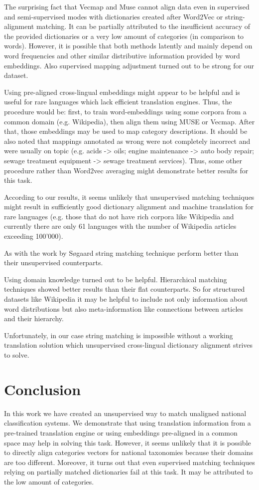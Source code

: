\documentclass[conference]{IEEEtran}
\begin{document}
The surprising fact that Vecmap and Muse cannot align data even in supervised and semi-supervised modes with dictionaries created after Word2Vec or string-alignment matching. It can be partially attributed to the insufficient accuracy of the provided dictionaries or a very low amount of categories (in comparison to words). However, it is possible that both methods latently and mainly depend on word frequencies and other similar distributive information provided by word embeddings. Also supervised mapping adjustment turned out to be strong for our dataset.

Using pre-aligned cross-lingual embeddings might appear to be helpful and is useful for rare languages which lack efficient translation engines. Thus, the procedure would be: first, to train word-embeddings using some corpora from a common domain (e.g. Wikipedia), then align them using MUSE or Vecmap. After that, those embeddings may be used to map category descriptions. It should be also noted that mappings annotated as wrong were not completely incorrect and were usually on topic (e.g. acids -> oils; engine maintenance -> auto body repair; sewage treatment equipment -> sewage treatment services). Thus, some other procedure rather than Word2vec averaging might demonstrate better results for this task.

According to our results, it seems unlikely that unsupervised matching techniques might result in sufficiently good dictionary alignment and machine translation for rare languages (e.g. those that do not have rich corpora like  Wikipedia and currently there are only 61 languages with the number of Wikipedia articles exceeding 100'000).

As with the work by Søgaard string matching technique perform better than their unsupervised counterparts.

Using domain knowledge turned out to be helpful. Hierarchical matching techniques showed better results than their flat counterparts. So for structured datasets like Wikipedia it may be helpful to include not only information about word distributions but also meta-information like connections between articles and their hierarchy.

Unfortunately, in our case string matching is impossible without a working translation solution which unsupervised cross-lingual dictionary alignment strives to solve.

\section{Conclusion}
In this work we have created an unsupervised way to match unaligned national classification systems. We demonstrate that using translation information from a pre-trained translation engine or using embeddings pre-aligned in a common space may help in solving this task. However, it seems unlikely that it is possible to directly align categories vectors for national taxonomies because their domains are too different. Moreover, it turns out that even supervised matching techniques relying on partially matched dictionaries fail at this task. It may be attributed to the low amount of categories.
\end{document}
